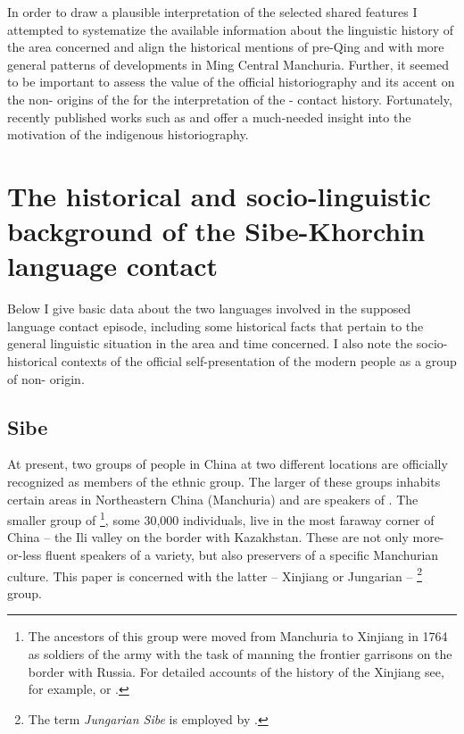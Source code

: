 \documentclass[output=paper,colorlinks,citecolor=brown]{langscibook}
\begin{document}
In order to draw a plausible interpretation of the selected shared features I attempted to systematize the available information about the linguistic history of the area concerned and align the historical mentions of pre-Qing  and  with more general patterns of developments in Ming Central Manchuria. Further, it seemed to be important to assess the value of the official  historiography and its accent on the non- origins of the  for the interpretation of the - contact history. Fortunately, recently published works such as \citet{Zhuangsheng2019} and \citet{Sárközi2019} offer a much-needed insight into the motivation of the indigenous  historiography.

\section{The historical and socio-linguistic background of the Sibe-Khorchin language contact}\label{section9.2}

Below I give basic data about the two languages involved in the supposed language contact episode, including some historical facts that pertain to the general linguistic situation in the area and time concerned. I also note the socio-historical contexts of the official self-presentation of the modern  people as a group of non- origin.

\subsection{Sibe}\label{section9.2.1}

At present, two groups of people in China at two different locations are officially recognized as members of the  ethnic group. The larger of these groups inhabits certain areas in Northeastern China (Manchuria) and are speakers of . The smaller group of \footnote{The ancestors of this group were moved from Manchuria to Xinjiang in 1764 as soldiers of the  army with the task of manning the frontier garrisons on the border with Russia. For detailed accounts of the history of the 	Xinjiang  see, for example, \citet{Sárközi2019} or \citet{Zhuangsheng2019}.}, some 30,000 individuals, live in the most faraway corner of China – the Ili valley on the border with Kazakhstan. These  are not only more-or-less fluent speakers of a  variety, but also preservers of a specific Manchurian culture. This paper is concerned with the latter – Xinjiang or Jungarian – \footnote{The term \textit{Jungarian Sibe} is employed by \citet[49]{Janhunen1996}.} group.
\end{document}
